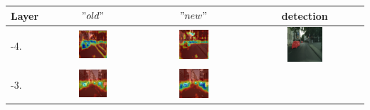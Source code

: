 \documentclass[12pt,oneside,a4paper]{article}
\theoremstyle{remark}
\newcommand{\oldh}{\( "old" \)}\label{makro2}
\newcommand{\newh}{\( "new" \)}
\begin{document}
\begin{table}[h!]

    \noindent\begin{tabular}{|p{}|c|c|c|}
        \hline
        \noindent Layer&\oldh & \newh & detection\\
        \hline
        -4.&\includegraphics[width=0.316\textwidth]{old_layer-4} &
        \includegraphics[width=0.316\textwidth]{new_l-4} &
        \includegraphics[width=0.316\textwidth]{img} \\
        \hline
        -3.&\includegraphics[width=0.316\textwidth]{old_layer-3} &
        \includegraphics[width=0.316\textwidth]{new_layer-3} &

\end{tabular}
\end{table}
\end{document}
